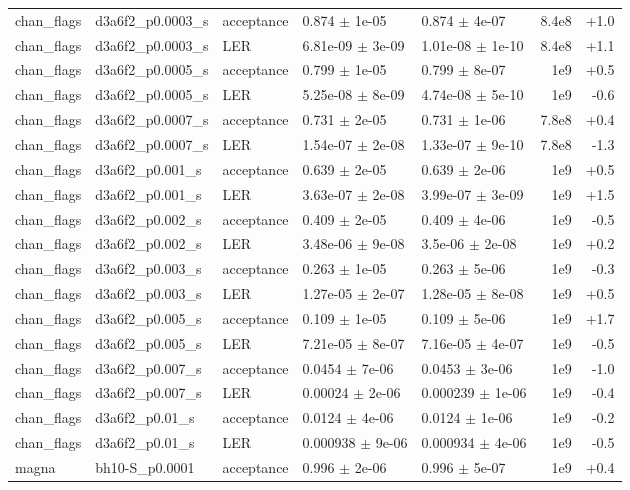 \documentclass[10pt]{article}
\begin{document}
{\begin{longtable}{l l l l l r r}
chan\_flags & d3a6f2\_p0.0003\_s & acceptance & 0.874 $\pm$ 1e-05 & 0.874 $\pm$ 4e-07 & 8.4e8 & +1.0 \\
chan\_flags & d3a6f2\_p0.0003\_s & LER & 6.81e-09 $\pm$ 3e-09 & 1.01e-08 $\pm$ 1e-10 & 8.4e8 & +1.1 \\
chan\_flags & d3a6f2\_p0.0005\_s & acceptance & 0.799 $\pm$ 1e-05 & 0.799 $\pm$ 8e-07 & 1e9 & +0.5 \\
chan\_flags & d3a6f2\_p0.0005\_s & LER & 5.25e-08 $\pm$ 8e-09 & 4.74e-08 $\pm$ 5e-10 & 1e9 & -0.6 \\
chan\_flags & d3a6f2\_p0.0007\_s & acceptance & 0.731 $\pm$ 2e-05 & 0.731 $\pm$ 1e-06 & 7.8e8 & +0.4 \\
chan\_flags & d3a6f2\_p0.0007\_s & LER & 1.54e-07 $\pm$ 2e-08 & 1.33e-07 $\pm$ 9e-10 & 7.8e8 & -1.3 \\
chan\_flags & d3a6f2\_p0.001\_s & acceptance & 0.639 $\pm$ 2e-05 & 0.639 $\pm$ 2e-06 & 1e9 & +0.5 \\
chan\_flags & d3a6f2\_p0.001\_s & LER & 3.63e-07 $\pm$ 2e-08 & 3.99e-07 $\pm$ 3e-09 & 1e9 & +1.5 \\
chan\_flags & d3a6f2\_p0.002\_s & acceptance & 0.409 $\pm$ 2e-05 & 0.409 $\pm$ 4e-06 & 1e9 & -0.5 \\
chan\_flags & d3a6f2\_p0.002\_s & LER & 3.48e-06 $\pm$ 9e-08 & 3.5e-06 $\pm$ 2e-08 & 1e9 & +0.2 \\
chan\_flags & d3a6f2\_p0.003\_s & acceptance & 0.263 $\pm$ 1e-05 & 0.263 $\pm$ 5e-06 & 1e9 & -0.3 \\
chan\_flags & d3a6f2\_p0.003\_s & LER & 1.27e-05 $\pm$ 2e-07 & 1.28e-05 $\pm$ 8e-08 & 1e9 & +0.5 \\
chan\_flags & d3a6f2\_p0.005\_s & acceptance & 0.109 $\pm$ 1e-05 & 0.109 $\pm$ 5e-06 & 1e9 & +1.7 \\
chan\_flags & d3a6f2\_p0.005\_s & LER & 7.21e-05 $\pm$ 8e-07 & 7.16e-05 $\pm$ 4e-07 & 1e9 & -0.5 \\
chan\_flags & d3a6f2\_p0.007\_s & acceptance & 0.0454 $\pm$ 7e-06 & 0.0453 $\pm$ 3e-06 & 1e9 & -1.0 \\
chan\_flags & d3a6f2\_p0.007\_s & LER & 0.00024 $\pm$ 2e-06 & 0.000239 $\pm$ 1e-06 & 1e9 & -0.4 \\
chan\_flags & d3a6f2\_p0.01\_s & acceptance & 0.0124 $\pm$ 4e-06 & 0.0124 $\pm$ 1e-06 & 1e9 & -0.2 \\
chan\_flags & d3a6f2\_p0.01\_s & LER & 0.000938 $\pm$ 9e-06 & 0.000934 $\pm$ 4e-06 & 1e9 & -0.5 \\
magna & bh10-S\_p0.0001 & acceptance & 0.996 $\pm$ 2e-06 & 0.996 $\pm$ 5e-07 & 1e9 & +0.4 \\

\end{longtable}}
\end{document}
